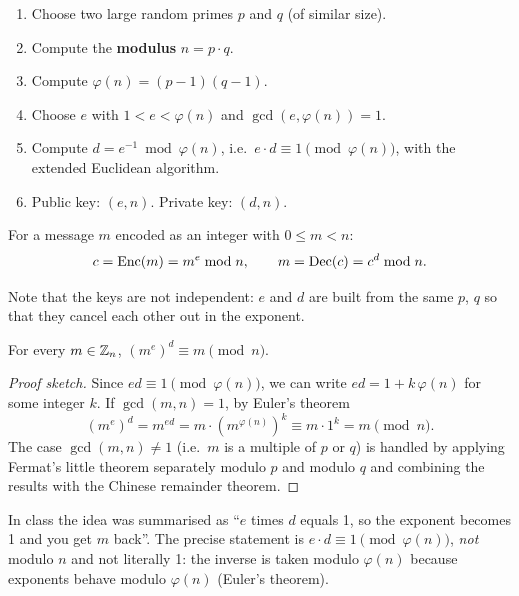 \begin{definition}
\leavevmode
\begin{enumerate}
    \item Choose two large random primes $p$ and $q$ (of similar size).
    \item Compute the \textbf{modulus} $n = p \cdot q$.
    \item Compute $\varphi(n) = (p-1)(q-1)$.
    \item Choose $e$ with $1 < e < \varphi(n)$ and $\gcd(e, \varphi(n)) = 1$.
    \item Compute $d = e^{-1} \bmod \varphi(n)$, i.e.\ $e \cdot d \equiv 1 \pmod{\varphi(n)}$, with the extended Euclidean algorithm.
    \item Public key: $(e, n)$. Private key: $(d, n)$.
\end{enumerate}
\end{definition}

\begin{definition}
For a message $m$ encoded as an integer with $0 \le m < n$:
\[
    c = \operatorname{Enc}(m) = m^{e} \bmod n, \qquad m = \operatorname{Dec}(c) = c^{d} \bmod n.
\]
\end{definition}

Note that the keys are not independent: $e$ and $d$ are built from the same $p$, $q$ so that they cancel each other out in the exponent.

\begin{theorem}
For every $m \in \mathbb{Z}_n$, $(m^e)^d \equiv m \pmod n$.
\end{theorem}
\begin{proof}[Proof sketch]
Since $ed \equiv 1 \pmod{\varphi(n)}$, we can write $ed = 1 + k\,\varphi(n)$ for some integer $k$. If $\gcd(m,n)=1$, by Euler's theorem
\[
(m^e)^d = m^{ed} = m \cdot \left(m^{\varphi(n)}\right)^{k} \equiv m \cdot 1^k = m \pmod n.
\]
The case $\gcd(m,n) \neq 1$ (i.e.\ $m$ is a multiple of $p$ or $q$) is handled by applying Fermat's little theorem separately modulo $p$ and modulo $q$ and combining the results with the Chinese remainder theorem.
\end{proof}

\begin{remark}[\enquote{$e \cdot d = 1$}]
In class the idea was summarised as \enquote{$e$ times $d$ equals 1, so the exponent becomes 1 and you get $m$ back}. The precise statement is $e \cdot d \equiv 1 \pmod{\varphi(n)}$, \emph{not} modulo $n$ and not literally 1: the inverse is taken modulo $\varphi(n)$ because exponents behave modulo $\varphi(n)$ (Euler's theorem).
\end{remark}

